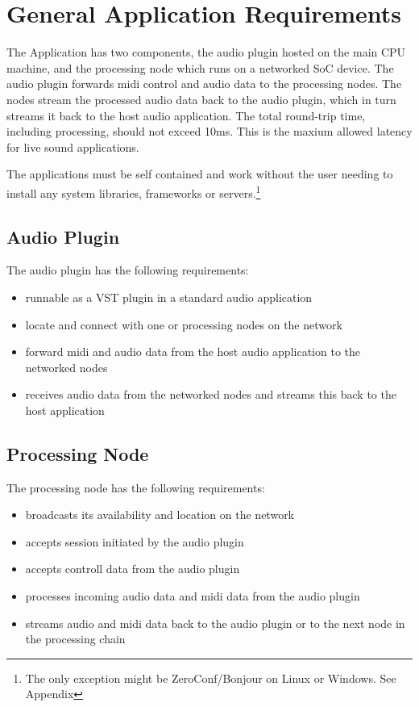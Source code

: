 \section{General Application Requirements}

The Application has two components, the audio plugin hosted on the main CPU machine, and the processing node which runs on a networked SoC device. The audio plugin forwards midi control and audio data to the processing nodes. The nodes stream the processed audio data back to the audio plugin, which in turn streams it back to the host audio application. The total round-trip time, including processing, should not exceed 10ms. This is the maxium allowed latency for live sound applications. \cite{AES67-2013}

The applications must be self contained and work without the user needing to install any system libraries, frameworks or servers.\footnote{The only exception might be ZeroConf/Bonjour on Linux or Windows. See Appendix}

\subsection{Audio Plugin}

The audio plugin has the following requirements:

\begin{itemize}

\item runnable as a VST plugin in a standard audio application
\item locate and connect with one or processing nodes on the network
\item forward midi and audio data from the host audio application to the networked nodes
\item receives audio data from the networked nodes and streams this back to the host application

\end{itemize}

\subsection{Processing Node}

The processing node has the following requirements:
\begin{itemize}

\item broadcasts its availability and location on the network
\item accepts session initiated by the audio plugin
\item accepts controll data from the audio plugin
\item processes incoming audio data and midi data from the audio plugin
\item streams audio and midi data back to the audio plugin or to the next node in the processing chain

\end{itemize}


